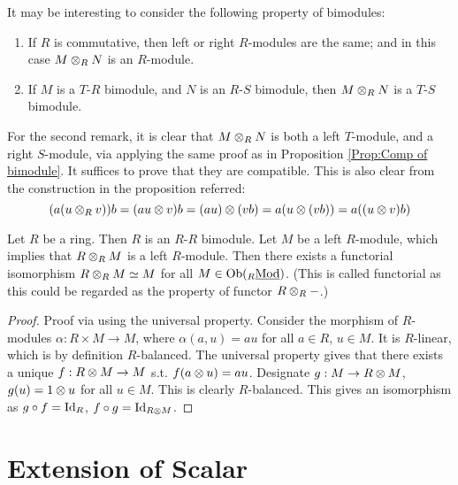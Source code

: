 \begin{remark}
    It may be interesting to consider the following property of bimodules:
    \begin{enumerate}
        \item If $R$ is commutative, then left or right $R$-modules are the same; and in this case $M \otimes_R N$ is an $R$-module. 
        \item If $M$ is a $T$-$R$ bimodule, and $N$ is an $R$-$S$ bimodule, then $M \otimes_R N$ is a $T$-$S$ bimodule.
    \end{enumerate}

    For the second remark, it is clear that $M \otimes_R N$ is both a left $T$-module, and a right $S$-module, via applying the same proof as in Proposition \ref{Prop:Comp of bimodule}. It suffices to prove that they are compatible. This is also clear from the construction in the proposition referred:
    \[
        (a(u \otimes_R v)) b = (au \otimes v) b = (au) \otimes (vb) = a(u \otimes (vb)) = a ((u\otimes v) b)
    \]
\end{remark}

\begin{remark}
    Let $R$ be a ring. Then $R$ is an $R$-$R$ bimodule. Let $M$ be a left $R$-module, which implies that $R \otimes_R M$ is a left $R$-module. Then there exists a functorial isomorphism $R \otimes_R M \simeq M$ for all $M \in \mathrm{Ob}({}_{R}\underline{\textup{Mod}})$. (This is called functorial as this could be regarded as the property of functor $R \otimes_R -$.)
\end{remark}

\begin{proof}
    Proof via using the universal property. Consider the morphism of $R$-modules $\alpha: R \times M \to M$, where $\alpha(a, u) = au$ for all $a \in R$, $u \in M$. It is $R$-linear, which is by definition $R$-balanced. The universal property gives that there exists a unique $f: R \otimes M \to M$ s.t. $f(a \otimes u) = au$. Designate $g: M \to R \otimes M$, $g(u) = 1 \otimes u$ for all $u\in M$. This is clearly $R$-balanced. This gives an isomorphism as $g \circ f = \mathrm{Id}_R$, $f \circ g = \mathrm{Id}_{R \otimes M}$.
\end{proof}

\section{Extension of Scalar}

